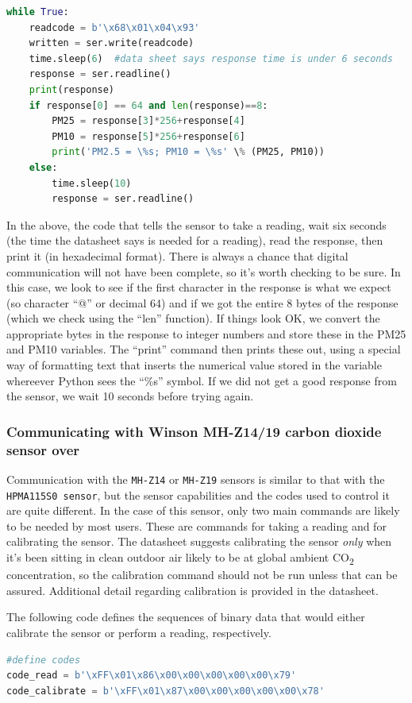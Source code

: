 \begin{lstlisting}[language=Python]
while True:
	readcode = b'\x68\x01\x04\x93'
	written = ser.write(readcode) 
	time.sleep(6)  #data sheet says response time is under 6 seconds
	response = ser.readline()
	print(response)
	if response[0] == 64 and len(response)==8:
		PM25 = response[3]*256+response[4]
		PM10 = response[5]*256+response[6]
		print('PM2.5 = \%s; PM10 = \%s' \% (PM25, PM10))
	else:
		time.sleep(10)
		response = ser.readline()

\end{lstlisting}

In the above, the code that tells the sensor to take a reading, wait six seconds (the time the datasheet says is needed for a reading), read the response, then print it (in hexadecimal format).
There is always a chance that digital communication will not have been complete, so it's worth checking to be sure.
In this case, we look to see if the first character in the response is what we expect (so character “@” or decimal 64) and if we got the entire 8 bytes of the response (which we check using the “len” function).
If things look OK, we convert the appropriate bytes in the response to integer numbers and store these in the PM25 and PM10 variables.
The “print” command then prints these out, using a special way of formatting text that inserts the numerical value stored in the variable whereever Python sees the “\%s” symbol.
If we did not get a good response from the sensor, we wait 10 seconds before trying again.

\subsubsection{Communicating with Winson MH-Z14/19 carbon dioxide sensor over \uart}

Communication with the \texttt{MH-Z14} or \texttt{MH-Z19} sensors is similar to that with the \texttt{HPMA115S0 sensor}, but the sensor capabilities and the codes used to control it are quite different.
In the case of this sensor, only two main commands are likely to be needed by most users.
These are commands for taking a reading and for calibrating the sensor.
The datasheet suggests calibrating the sensor \emph{only} when it's been sitting in clean outdoor air likely to be at global ambient CO\textsubscript{2} concentration, so the calibration command should not be run unless that can be assured.
Additional detail regarding calibration is provided in the datasheet.

The following code defines the sequences of binary data that would either calibrate the sensor or perform a reading, respectively.
\begin{lstlisting}[language=Python]
#define codes
code_read = b'\xFF\x01\x86\x00\x00\x00\x00\x00\x79'
code_calibrate = b'\xFF\x01\x87\x00\x00\x00\x00\x00\x78'
\end{lstlisting}

